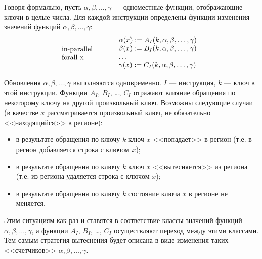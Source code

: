 Говоря формально, пусть $\alpha, \beta, \dots, \gamma$ --- одноместные функции,
отображающие ключи в целые числа. Для каждой инструкции определены функции
изменения значений функций $\alpha, \beta, \dots, \gamma$:
$$\parbox{2.5cm}{in-parallel\\forall x~}\left|\begin{array}{l}
\alpha(x) := A_I(k, \alpha, \beta, \dots, \gamma)\\
\beta(x) := B_I(k, \alpha, \beta, \dots, \gamma)\\
\dots\\
\gamma(x) := C_I(k, \alpha, \beta, \dots, \gamma)\\
\end{array}\right.
$$

Обновления $\alpha, \beta, \dots, \gamma$ выполняются одновременно. $I$ ---
инструкция, $k$ --- ключ в этой инструкции. Функции $A_I$, $B_I$, \dots, $C_I$
отражают влияние обращения по некоторому ключу на другой произвольный ключ.
Возможны следующие случаи (в качестве $x$ рассматривается произвольный ключ, не
обязательно <<находящийся>> в регионе):
\begin{itemize}
    \item в результате обращения по ключу $k$ ключ $x$ <<попадает>> в регион
(т.е. в регион добавляется строка с ключом $x$);
    \item в результате обращения по ключу $k$ ключ $x$ <<вытесняется>> из
региона (т.е. из региона удаляется строка с ключом $x$);
    \item в результате обращения по ключу $k$ состояние ключа $x$ в регионе не
меняется.
\end{itemize}

Этим ситуациям как раз и ставятся в соответствие классы значений функций
$\alpha, \beta, \dots, \gamma$, а функции $A_I$, $B_I$, \dots, $C_I$
осуществляют переход между этими классами. Тем самым стратегия вытеснения будет
описана в виде изменения таких <<счетчиков>> $\alpha, \beta, \dots, \gamma$.

